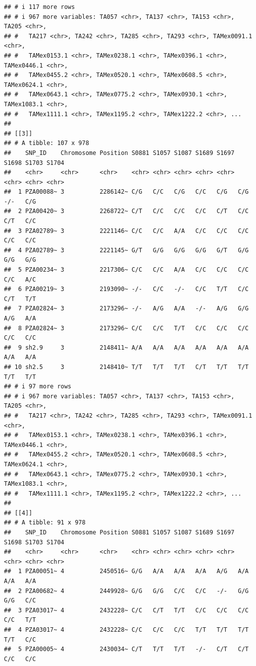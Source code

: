 \documentclass[
]{article}
\begin{document}
\begin{verbatim}
## # i 117 more rows
## # i 967 more variables: TA057 <chr>, TA137 <chr>, TA153 <chr>, TA205 <chr>,
## #   TA217 <chr>, TA242 <chr>, TA285 <chr>, TA293 <chr>, TAMex0091.1 <chr>,
## #   TAMex0153.1 <chr>, TAMex0238.1 <chr>, TAMex0396.1 <chr>, TAMex0446.1 <chr>,
## #   TAMex0455.2 <chr>, TAMex0520.1 <chr>, TAMex0608.5 <chr>, TAMex0624.1 <chr>,
## #   TAMex0643.1 <chr>, TAMex0775.2 <chr>, TAMex0930.1 <chr>, TAMex1083.1 <chr>,
## #   TAMex1111.1 <chr>, TAMex1195.2 <chr>, TAMex1222.2 <chr>, ...
## 
## [[3]]
## # A tibble: 107 x 978
##    SNP_ID    Chromosome Position S0881 S1057 S1087 S1689 S1697 S1698 S1703 S1704
##    <chr>     <chr>      <chr>    <chr> <chr> <chr> <chr> <chr> <chr> <chr> <chr>
##  1 PZA00088~ 3          2286142~ C/G   C/C   C/G   C/C   C/G   C/G   -/-   C/G  
##  2 PZA00420~ 3          2268722~ C/T   C/C   C/C   C/C   C/T   C/C   C/T   C/C  
##  3 PZA02789~ 3          2221146~ C/C   C/C   A/A   C/C   C/C   C/C   C/C   C/C  
##  4 PZA02789~ 3          2221145~ G/T   G/G   G/G   G/G   G/T   G/G   G/G   G/G  
##  5 PZA00234~ 3          2217306~ C/C   C/C   A/A   C/C   C/C   C/C   C/C   A/C  
##  6 PZA00219~ 3          2193090~ -/-   C/C   -/-   C/C   T/T   C/C   C/T   T/T  
##  7 PZA02824~ 3          2173296~ -/-   A/G   A/A   -/-   A/G   G/G   A/G   A/A  
##  8 PZA02824~ 3          2173296~ C/C   C/C   T/T   C/C   C/C   C/C   C/C   C/C  
##  9 sh2.9     3          2148411~ A/A   A/A   A/A   A/A   A/A   A/A   A/A   A/A  
## 10 sh2.5     3          2148410~ T/T   T/T   T/T   C/T   T/T   T/T   T/T   T/T  
## # i 97 more rows
## # i 967 more variables: TA057 <chr>, TA137 <chr>, TA153 <chr>, TA205 <chr>,
## #   TA217 <chr>, TA242 <chr>, TA285 <chr>, TA293 <chr>, TAMex0091.1 <chr>,
## #   TAMex0153.1 <chr>, TAMex0238.1 <chr>, TAMex0396.1 <chr>, TAMex0446.1 <chr>,
## #   TAMex0455.2 <chr>, TAMex0520.1 <chr>, TAMex0608.5 <chr>, TAMex0624.1 <chr>,
## #   TAMex0643.1 <chr>, TAMex0775.2 <chr>, TAMex0930.1 <chr>, TAMex1083.1 <chr>,
## #   TAMex1111.1 <chr>, TAMex1195.2 <chr>, TAMex1222.2 <chr>, ...
## 
## [[4]]
## # A tibble: 91 x 978
##    SNP_ID    Chromosome Position S0881 S1057 S1087 S1689 S1697 S1698 S1703 S1704
##    <chr>     <chr>      <chr>    <chr> <chr> <chr> <chr> <chr> <chr> <chr> <chr>
##  1 PZA00051~ 4          2450516~ G/G   A/A   A/A   A/A   A/G   A/A   A/A   A/A  
##  2 PZA00682~ 4          2449928~ G/G   G/G   C/C   C/C   -/-   G/G   G/G   C/C  
##  3 PZA03017~ 4          2432228~ C/C   C/T   T/T   C/C   C/C   C/C   C/C   T/T  
##  4 PZA03017~ 4          2432228~ C/C   C/C   C/C   T/T   T/T   T/T   T/T   C/C  
##  5 PZA00005~ 4          2430034~ C/T   T/T   T/T   -/-   C/T   C/T   C/C   C/C  

\end{verbatim}
\end{document}
